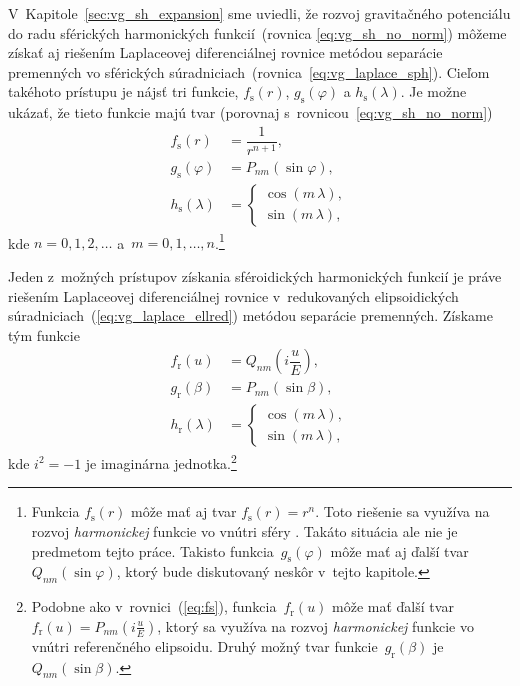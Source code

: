 \documentclass[a4paper,12pt]{book}
\begin{document}
V~Kapitole~\ref{sec:vg_sh_expansion} sme uviedli, že rozvoj gravitačného 
potenciálu do radu sférických harmonických funkcií~(rovnica 
\ref{eq:vg_sh_no_norm}) môžeme získať aj riešením Laplaceovej diferenciálnej 
rovnice metódou separácie premenných vo sférických 
súradniciach~(rovnica~\ref{eq:vg_laplace_sph}).  Cieľom takéhoto prístupu je 
nájsť tri funkcie, $f_{\mathrm{s}}(r)$, $g_{\mathrm{s}}(\varphi)$ 
a $h_{\mathrm{s}}(\lambda)$.  Je možne ukázať, že tieto funkcie majú tvar 
(porovnaj s~rovnicou~\ref{eq:vg_sh_no_norm})
%
\begin{align}
\label{eq:fs}
f_{\mathrm{s}}(r) &= \dfrac{1}{r^{n + 1}}{,}\\
%
\label{eq:gs}
g_{\mathrm{s}}(\varphi) &= P_{nm}(\sin\varphi){,}\\
%
\label{eq:hs}
h_{\mathrm{s}}(\lambda) &=
%
\begin{cases}
\cos(m\,\lambda){,}\\
\sin(m\,\lambda){,}
\end{cases}
\end{align}
%
kde $n = 0, 1, 2, \dots$ a~$m = 0, 1, \dots, n$.\footnote{Funkcia 
$f_{\mathrm{s}}(r)$ môže mať aj tvar $f_{\mathrm{s}}(r) = r^n$.  Toto riešenie 
sa využíva na rozvoj \emph{harmonickej} funkcie vo vnútri sféry 
\parencite{MoritzPhysicalGeodesy}.  Takáto situácia ale nie je predmetom tejto 
práce.  Takisto funkcia~$g_\mathrm{s}(\varphi)$ môže mať aj ďalší 
tvar~$Q_{nm}(\sin\varphi)$, ktorý bude diskutovaný neskôr v~tejto kapitole.}

Jeden z~možných prístupov získania sféroidických harmonických funkcií je práve 
riešením Laplaceovej diferenciálnej rovnice v~redukovaných elipsoidických 
súradniciach~(\ref{eq:vg_laplace_ellred}) metódou separácie premenných.  
Získame tým funkcie \parencite{MoritzPhysicalGeodesy}
%
\begin{align}
\label{eq:fr}
f_{\mathrm{r}}(u) &=
Q_{nm}\left( i \dfrac{u}{E} \right){,}\\
%
\label{eq:gr}
g_{\mathrm{r}}(\beta) &= P_{nm}(\sin\beta){,}\\
%
\label{eq:hr}
h_{\mathrm{r}}(\lambda) &=
%
\begin{cases}
\cos(m\,\lambda){,}\\
\sin(m\,\lambda){,}
\end{cases}
\end{align}
%
kde $i^2 = -1$ je imaginárna jednotka.\footnote{Podobne ako 
v~rovnici~(\ref{eq:fs}), funkcia~$f_{\mathrm{r}}(u)$ môže mať ďalší tvar 
$f_{\mathrm{r}}(u) = P_{nm}\left( i \frac{u}{E} \right)$, ktorý sa využíva na 
rozvoj \emph{harmonickej} funkcie vo vnútri referenčného elipsoidu.  Druhý 
možný tvar funkcie~$g_\mathrm{r}(\beta)$ je~$Q_{nm}(\sin\beta)$.}
\end{document}
